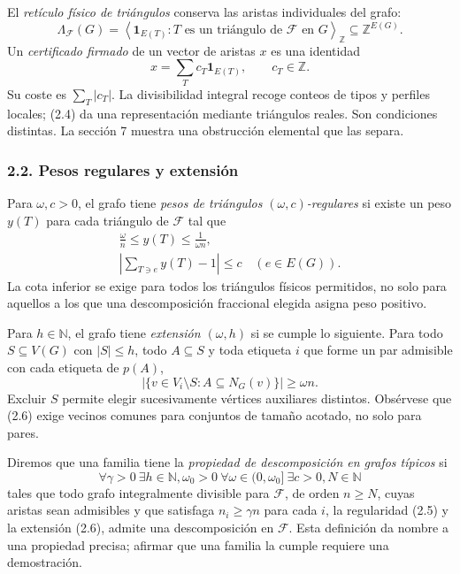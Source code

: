 \documentclass[spanish,11pt,a4paper]{article}
\begin{document}
El \emph{retículo físico de triángulos} conserva las aristas individuales del grafo: \[\Lambda_{\mathcal F}(G)
=\left\langle\mathbf1_{E(T)}:T\text{ es un triángulo de }\mathcal F\text{ en }G\right\rangle_{\mathbb Z}
\subseteq\mathbb Z^{E(G)}.
\tag{2.3}\] Un \emph{certificado firmado} de un vector de aristas \(x\) es una identidad \[x=\sum_T c_T\mathbf1_{E(T)},\qquad c_T\in\mathbb Z.
\tag{2.4}\] Su coste es \(\sum_T|c_T|\). La divisibilidad integral recoge conteos de tipos y perfiles locales; (2.4) da una representación mediante triángulos reales. Son condiciones distintas. La sección 7 muestra una obstrucción elemental que las separa.

\subsubsection{2.2. Pesos regulares y extensión}\label{pesos-regulares-y-extensiuxf3n}

Para \(\omega,c>0\), el grafo tiene \emph{pesos de triángulos \((\omega,c)\)-regulares} si existe un peso \(y(T)\) para cada triángulo de \(\mathcal F\) tal que \[\begin{gathered}
\frac{\omega}{n}\le y(T)\le\frac1{\omega n},\\
\left|\sum_{T\ni e}y(T)-1\right|\le c
\quad(e\in E(G)).
\end{gathered}
\tag{2.5}\] La cota inferior se exige para todos los triángulos físicos permitidos, no solo para aquellos a los que una descomposición fraccional elegida asigna peso positivo.

Para \(h\in\mathbb N\), el grafo tiene \emph{extensión \((\omega,h)\)} si se cumple lo siguiente. Para todo \(S\subseteq V(G)\) con \(|S|\le h\), todo \(A\subseteq S\) y toda etiqueta \(i\) que forme un par admisible con cada etiqueta de \(p(A)\), \[\left|\{v\in V_i\setminus S:A\subseteq N_G(v)\}\right|\ge\omega n.
\tag{2.6}\] Excluir \(S\) permite elegir sucesivamente vértices auxiliares distintos. Obsérvese que (2.6) exige vecinos comunes para conjuntos de tamaño acotado, no solo para pares.

Diremos que una familia tiene la \emph{propiedad de descomposición en grafos típicos} si \[\forall\gamma>0\ \exists h\in\mathbb N,\omega_0>0\ 
\forall\omega\in(0,\omega_0]\ \exists c>0,N\in\mathbb N
\tag{2.7}\] tales que todo grafo integralmente divisible para \(\mathcal F\), de orden \(n\ge N\), cuyas aristas sean admisibles y que satisfaga \(n_i\ge\gamma n\) para cada \(i\), la regularidad (2.5) y la extensión (2.6), admite una descomposición en \(\mathcal F\). Esta definición da nombre a una propiedad precisa; afirmar que una familia la cumple requiere una demostración.
\end{document}
